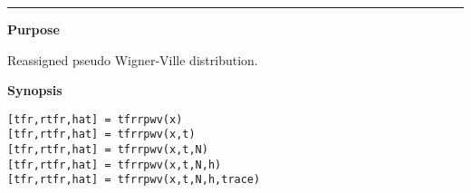 

\hspace*{-1.6cm}{\Large \bf tfrrpwv}

\vspace*{-.4cm}
\hspace*{-1.6cm}\rule[0in]{16.5cm}{.02cm}
\vspace*{.2cm}

{\bf \large {}\selectfont Purpose}\\
\hspace*{1.5cm}
\begin{minipage}[t]{13.5cm}
Reassigned  pseudo Wigner-Ville distribution.
\end{minipage}
\vspace*{.5cm}

{\bf \large {}\selectfont Synopsis}\\
\hspace*{1.5cm}
\begin{minipage}[t]{13.5cm}
\begin{verbatim}
[tfr,rtfr,hat] = tfrrpwv(x) 
[tfr,rtfr,hat] = tfrrpwv(x,t) 
[tfr,rtfr,hat] = tfrrpwv(x,t,N) 
[tfr,rtfr,hat] = tfrrpwv(x,t,N,h) 
[tfr,rtfr,hat] = tfrrpwv(x,t,N,h,trace) 
\end{verbatim}
\end{minipage}
\vspace*{.35cm}

